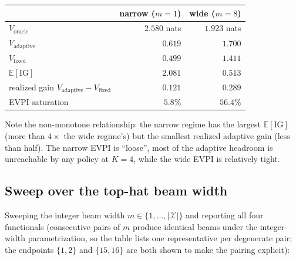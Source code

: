 \documentclass[11pt,a4paper,onecolumn]{article}
\newcommand{\E}{\mathbb{E}}
\begin{document}
\begin{center}
\begin{tabular}{@{}lrr@{}}
\toprule
 & narrow ($m = 1$) & wide ($m = 8$) \\
\midrule
$V_{\text{oracle}}$       & $2.580$ nats & $1.923$ nats \\
$V_{\text{adaptive}}$     & $0.619$      & $1.700$      \\
$V_{\text{fixed}}$        & $0.499$      & $1.411$      \\
$\E[\mathrm{IG}]$         & $2.081$      & $0.513$      \\
realized gain $V_{\text{adaptive}} - V_{\text{fixed}}$ & $0.121$ & $0.289$ \\
EVPI saturation           & $5.8\%$      & $56.4\%$     \\
\bottomrule
\end{tabular}
\end{center}

Note the non-monotone relationship: the narrow regime has the largest $\E[\mathrm{IG}]$ (more than $4\times$ the wide regime's) but the smallest realized adaptive gain (less than half).  The narrow EVPI is ``loose'', most of the adaptive headroom is unreachable by any policy at $K = 4$, while the wide EVPI is relatively tight.

\subsection{Sweep over the top-hat beam width}

Sweeping the integer beam width $m \in \{1, \ldots, |\mathcal{X}|\}$ and reporting all four functionals (consecutive pairs of $m$ produce identical beams under the integer-width parametrization, so the table lists one representative per degenerate pair; the endpoints $\{1, 2\}$ and $\{15, 16\}$ are both shown to make the pairing explicit):
\end{document}
